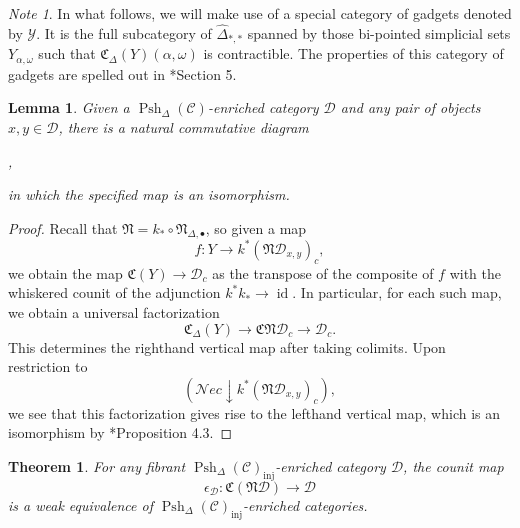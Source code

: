 \documentclass[leqno]{article}
\numberwithin{equation}{subsection}
\theoremstyle{plain}   %
\newtheorem{thm}[equation]{Theorem}
\newtheorem{lemma}[equation]{Lemma}
\theoremstyle{remark}
\newtheorem{note}[equation]{Note}
\theoremstyle{plain}
\DeclareMathOperator{\id}{id}
\DeclareMathOperator*{\coliml}{colim}
\newcommand{\Nec}{\ensuremath{{\mathcal{N}ec}}}
\newcommand{\overcat}[2]{{\left(#1\downarrow #2\right)}}
\newcommand{\psh}[1]{\ensuremath{\widehat{#1}}}
\newcommand{\spsh}{\ensuremath{\operatorname{Psh}_\Delta(\mathcal{C})}}
\begin{document}
\begin{note}
	In what follows, we will make use of a special category of gadgets denoted by \(\mathcal{Y}\).  It is the full subcategory of \(\psh{\Delta}_{\ast,\ast}\) spanned by those bi-pointed simplicial sets \(Y_{\alpha,\omega}\) such that \(\mathfrak{C}_\Delta(Y)(\alpha,\omega)\) is contractible.  The properties of this category of gadgets are spelled out in \cite{ds2}*{Section 5}.
\end{note}
\begin{lemma}\label{dssquare}
	Given a \(\spsh\)-enriched category \(\mathcal{D}\) and any pair of objects \(x,y\in \mathcal{D}\), there is a natural commutative diagram
	\begin{center}
		,
	\end{center}
	in which the specified map is an isomorphism.
\end{lemma}
\begin{proof}
Recall that \(\mathfrak{N}=k_\ast \circ \mathfrak{N}_{\Delta,\bullet}\), so given a map \[f:Y\to k^\ast(\mathfrak{N}\mathcal{D}_{x,y})_c,\] we obtain the map \(\mathfrak{C}(Y)\to \mathcal{D}_c\) as the transpose of the composite of \(f\) with the whiskered counit of the adjunction \(k^\ast k_\ast \to \id\).   In particular, for each such map, we obtain a universal factorization \[\mathfrak{C}_\Delta(Y) \to \mathfrak{C}\mathfrak{N}\mathcal{D}_c\to \mathcal{D}_c.\] This determines the righthand vertical map after taking colimits.
Upon restriction to \[\overcat{\Nec}{k^\ast(\mathfrak{N}\mathcal{D}_{x,y})_c},\] we see that this factorization gives rise to the lefthand vertical map, which is an isomorphism by \cite{ds1}*{Proposition 4.3}.  
\end{proof}
\begin{thm}\label{counitthm}
  For any fibrant \(\spsh_{\mathrm{inj}}\)-enriched category \(\mathcal{D}\), the counit map
	\[\epsilon_\mathcal{D}:\mathfrak{C}(\mathfrak{N}\mathcal{D})\to \mathcal{D}\]
	is a weak equivalence of \(\spsh_{\mathrm{inj}}\)-enriched categories.
\end{thm}
\end{document}
